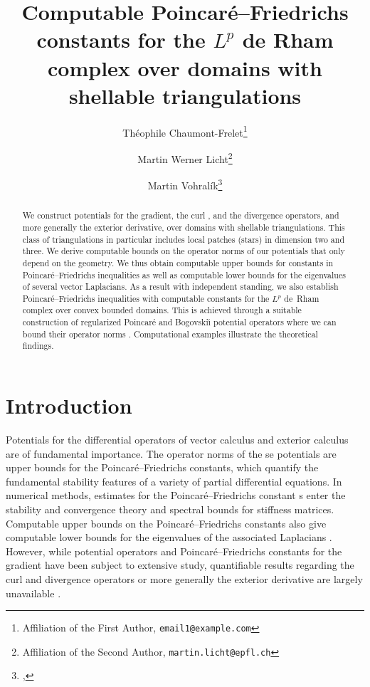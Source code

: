\documentclass[10pt,letterpaper]{article}
\title{Computable Poincar\'e--Friedrichs constants for the $L^{p}$ de Rham complex over \cye{convex domains and} domains with shellable triangulations}
\author{
    Th\'eophile Chaumont-Frelet\thanks{Affiliation of the First Author, \texttt{email1@example.com}} \and
    Martin Werner Licht\thanks{Affiliation of the Second Author, \texttt{martin.licht@epfl.ch}} \and
    Martin Vohral\'ik\thanks{\cye{Inria, 48 rue Barrault, 75647 Paris, France \&
CERMICS, Ecole des Ponts, 77455 Marne-la-Vallée, France}, \texttt{\cye{martin.vohralik@inria.fr}}}
}
\newcommand\cye[1]{%
  \protect\leavevmode
  \begingroup
    \color{red!35!yellow}%
    #1%
  \endgroup
}
\begin{document}
\maketitle

\begin{abstract}
    We construct potentials for the gradient, the curl\cye{,} and the divergence operators, and more generally the exterior derivative, over domains with shellable triangulations. This class of triangulations \cye{in particular} includes local \cye{patches (stars)} in dimension two and three. 
    \cye{We derive} computable bounds \cye{on} the operator norms of our potentials that only depend on the geometry. We thus obtain computable upper bounds for \cye{constants in} Poincar\'e--Friedrichs inequalities \cye{as well as} computable lower bounds for the eigenvalues of several vector Laplacians. 
    As a result with independent standing, we \cye{also} establish Poincar\'e--Friedrichs inequalities \cye{with computable constants} for the $L^{p}$ de~Rham complex over convex bounded domains. 
    This is achieved through \cye{a suitable construction of regularized} Poincar\'e and Bogovski\u{\i} potential operators \cye{where we can bound their operator norms}.
    \cye{Computational examples illustrate the theoretical findings.}
\end{abstract}


\tableofcontents


\section{Introduction}\label{section:intro}


Potentials for the differential operators of vector calculus and exterior calculus are of fundamental importance. The operator norms of the\cye{se} potentials are upper bounds for the Poincar\'e--Friedrichs constants, which quantify the fundamental stability features of a variety of partial differential equations. In numerical methods, estimates for the Poincar\'e--Friedrichs constant\cye{s} enter the stability and convergence theory and spectral bounds for \cye{stiffness} matrices. \cye{Computable upper bounds on the Poincar\'e--Friedrichs constants also give computable lower bounds for the eigenvalues of the associated Laplacians}. However, while potential operators and Poincar\'e--Friedrichs constants for the gradient have been subject to extensive study, quantifiable results regarding the curl and divergence operators or \cye{more generally} the exterior derivative are \cye{largely unavailable}. 
\end{document}

